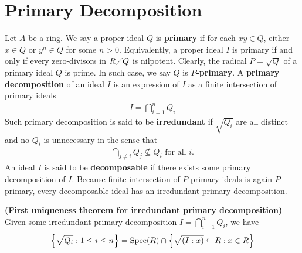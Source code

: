 \documentclass{report}
\begin{document}
\section{Primary Decomposition}
Let $A$ be a ring. We say a proper ideal $Q$ is \textbf{primary} if for each $xy \in Q$, either $x \in Q$ or $y^n \in Q$ for some $n>0$. Equivalently, a proper ideal $I$ is primary if and only if every zero-divisors in $R \diagup  Q$ is nilpotent. Clearly, the radical $P=\sqrt{Q} $ of a primary ideal $Q$ is prime. In such case, we say $Q$ is $P$\textbf{-primary}. A \textbf{primary decomposition} of an ideal $I$ is an expression of $I$ as a finite intersection of primary ideals
 \begin{align*}
I= \bigcap_{i=1}^n Q_i
\end{align*}
Such primary decomposition is said to be \textbf{irredundant} if $\sqrt{Q_i}$ are all distinct and no $Q_i$ is unnecessary in the sense that 
\begin{align*}
\bigcap_{j\neq i}Q_j \not \subseteq Q_i\text{ for all }i. 
\end{align*}
An ideal $I$ is said to be  \textbf{decomposable} if there exists some primary decomposition of $I$. Because finite intersection of $P$-primary ideals is again  $P$-primary, every decomposable ideal has an irredundant primary decomposition.  
\begin{theorem}
\label{Fut}
\textbf{(First uniqueness theorem for irredundant primary decomposition)} Given some irredundant primary decomposition $I= \bigcap_{i=1}^n Q_i$, we have 
\begin{align}
\label{QiR}
\Big\{ \sqrt{Q_i}:1\leq i\leq n \Big\}= \operatorname{Spec}(R) \cap \Big\{ \sqrt{(I:x)} \subseteq R: x \in R  \Big\} 
\end{align}
\end{theorem}
\end{document}
